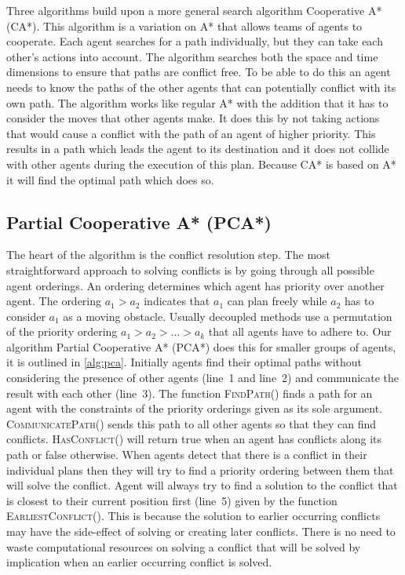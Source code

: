 Three algorithms build upon a more general search algorithm
Cooperative A* (CA*). This algorithm is a variation on A* \cite{hart1968} that
allows teams of agents to cooperate. Each agent searches for a path
individually, but they can take each other's actions into account. The
algorithm searches both the space and time dimensions to ensure that paths are
conflict free. To be able to do this an agent needs to know the paths of the
other agents that can potentially conflict with its own path. The algorithm
works like regular A* with the addition that it has to consider the moves that
other agents make. It does this by not taking actions that would cause a
conflict
with the path of an agent of higher priority. This results in a path which
leads the agent to its destination and it does not collide with other agents
during the execution of this plan. Because CA* is based on A* it will find the
optimal path which does so.

\subsection{Partial Cooperative A* (PCA*)}

The heart of the algorithm is the conflict resolution step. The most
straightforward approach to solving conflicts is by going through all possible
agent orderings. An ordering determines which agent has priority over another
agent. The ordering $a_1 > a_2$ indicates that $a_1$ can plan freely while
$a_2$ has to consider $a_1$ as a moving obstacle. Usually decoupled methods use
a permutation of the priority ordering $a_1 > a_2 > \ldots > a_k$ that all
agents have to adhere to. Our algorithm Partial Cooperative A* (PCA*) does this 
for smaller groups of agents, it is outlined in \autoref{alg:pca}. Initially 
agents find their optimal paths without considering the presence of other 
agents (line~1 and line~2) and communicate the result with each other (line~3). 
The function \textsc{FindPath()} finds a path for an agent with the constraints 
of the priority orderings given as its sole argument. 
\textsc{CommunicatePath()} 
sends this path to all other agents so that they can find conflicts. 
\textsc{HasConflict()} will return true when an agent has conflicts along its 
path or false otherwise.
When agents detect that there is a conflict in their individual plans then they 
will try to find a priority ordering between them that will solve the conflict. 
Agent will always try to find a solution to the conflict that is closest to 
their current position first (line~5) given by the function 
\textsc{EarliestConflict()}. This is because the solution to earlier 
occurring conflicts may have the side-effect of solving or creating later 
conflicts. There is no need to waste computational resources on solving a 
conflict that will be solved by implication when an earlier occurring conflict 
is solved.

